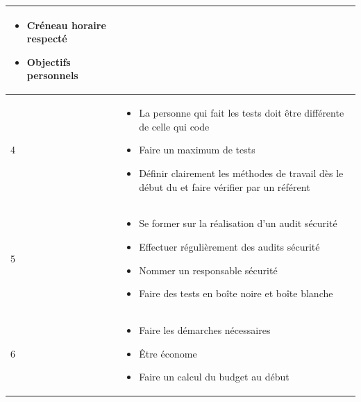 \begin{longtable}{|p{7cm}|p{7cm}|}
\begin{itemize}
		\item Créneau horaire respecté

		\item Objectifs personnels

	\end{itemize} \\

	\hline

	4 & \begin{itemize}

		\item La personne qui fait les tests doit être différente de celle qui code

		\item Faire un maximum de tests

		\item Définir clairement les méthodes de travail dès le début du \PICCourt et faire vérifier par un référent

	\end{itemize} \\

	\hline

	5 & \begin{itemize}

		\item Se former sur la réalisation d'un audit sécurité

		\item Effectuer régulièrement des audits sécurité

		\item Nommer un responsable sécurité

		\item Faire des tests en boîte noire et boîte blanche

	\end{itemize} \\

	\hline

	6 & \begin{itemize}

		\item Faire les démarches nécessaires

		\item Être économe

		\item Faire un calcul du budget au début

	\end{itemize} \\

	\hline


\end{longtable}
